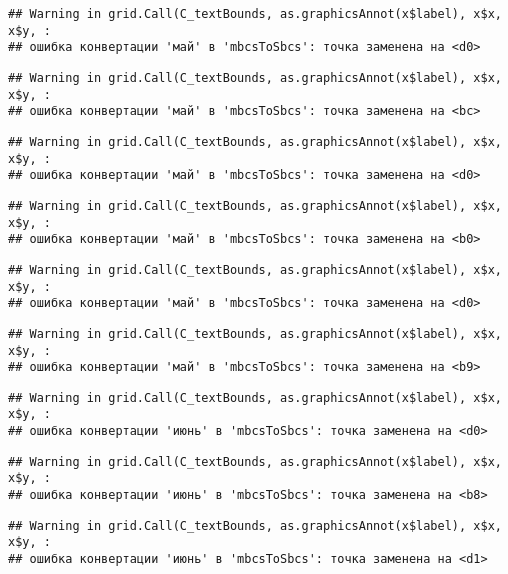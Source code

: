\documentclass[
]{article}
\begin{document}
\begin{verbatim}
## Warning in grid.Call(C_textBounds, as.graphicsAnnot(x$label), x$x, x$y, :
## ошибка конвертации 'май' в 'mbcsToSbcs': точка заменена на <d0>
\end{verbatim}

\begin{verbatim}
## Warning in grid.Call(C_textBounds, as.graphicsAnnot(x$label), x$x, x$y, :
## ошибка конвертации 'май' в 'mbcsToSbcs': точка заменена на <bc>
\end{verbatim}

\begin{verbatim}
## Warning in grid.Call(C_textBounds, as.graphicsAnnot(x$label), x$x, x$y, :
## ошибка конвертации 'май' в 'mbcsToSbcs': точка заменена на <d0>
\end{verbatim}

\begin{verbatim}
## Warning in grid.Call(C_textBounds, as.graphicsAnnot(x$label), x$x, x$y, :
## ошибка конвертации 'май' в 'mbcsToSbcs': точка заменена на <b0>
\end{verbatim}

\begin{verbatim}
## Warning in grid.Call(C_textBounds, as.graphicsAnnot(x$label), x$x, x$y, :
## ошибка конвертации 'май' в 'mbcsToSbcs': точка заменена на <d0>
\end{verbatim}

\begin{verbatim}
## Warning in grid.Call(C_textBounds, as.graphicsAnnot(x$label), x$x, x$y, :
## ошибка конвертации 'май' в 'mbcsToSbcs': точка заменена на <b9>
\end{verbatim}

\begin{verbatim}
## Warning in grid.Call(C_textBounds, as.graphicsAnnot(x$label), x$x, x$y, :
## ошибка конвертации 'июнь' в 'mbcsToSbcs': точка заменена на <d0>
\end{verbatim}

\begin{verbatim}
## Warning in grid.Call(C_textBounds, as.graphicsAnnot(x$label), x$x, x$y, :
## ошибка конвертации 'июнь' в 'mbcsToSbcs': точка заменена на <b8>
\end{verbatim}

\begin{verbatim}
## Warning in grid.Call(C_textBounds, as.graphicsAnnot(x$label), x$x, x$y, :
## ошибка конвертации 'июнь' в 'mbcsToSbcs': точка заменена на <d1>
\end{verbatim}
\end{document}

